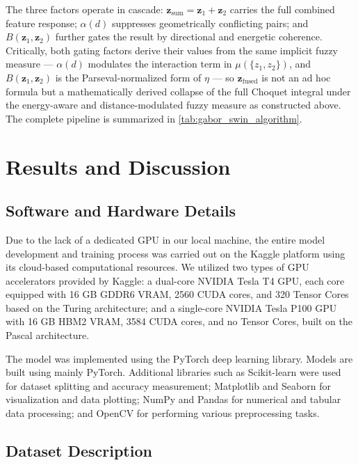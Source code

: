 \documentclass[12pt]{article}
\begin{document}
The three factors operate in cascade: $\mathbf{z}_{\text{sum}} = \mathbf{z}_1+\mathbf{z}_2$ carries the full combined feature response; $\alpha(d)$ suppresses geometrically conflicting pairs; and $B(\mathbf{z}_1,\mathbf{z}_2)$ further gates the result by directional and energetic coherence. Critically, both gating factors derive their values from the same implicit fuzzy measure — $\alpha(d)$ modulates the interaction term in $\mu(\{z_1,z_2\})$, and $B(\mathbf{z}_1,\mathbf{z}_2)$ is the Parseval-normalized form of $\eta$ — so $\mathbf{z}_{\text{fused}}$ is not an ad hoc formula but a mathematically derived collapse of the full Choquet integral under the energy-aware and distance-modulated fuzzy measure as constructed above. The complete pipeline is summarized in \autoref{tab:gabor_swin_algorithm}.

\section{Results and Discussion}

\subsection{Software and Hardware Details}

Due to the lack of a dedicated GPU in our local machine, the entire model development and training process was carried out on the Kaggle platform using its cloud-based computational resources. We utilized two types of GPU accelerators provided by Kaggle: a dual-core NVIDIA Tesla T4 GPU, each core equipped with 16 GB GDDR6 VRAM, 2560 CUDA cores, and 320 Tensor Cores based on the Turing architecture; and a single-core NVIDIA Tesla P100 GPU with 16 GB HBM2 VRAM, 3584 CUDA cores, and no Tensor Cores, built on the Pascal architecture.

The model was implemented using the PyTorch deep learning library. Models are built using mainly PyTorch. Additional libraries such as Scikit-learn were used for dataset splitting and accuracy measurement; Matplotlib and Seaborn for visualization and data plotting; NumPy and Pandas for numerical and tabular data processing; and OpenCV for performing various preprocessing tasks.

\subsection{Dataset Description}
\end{document}
